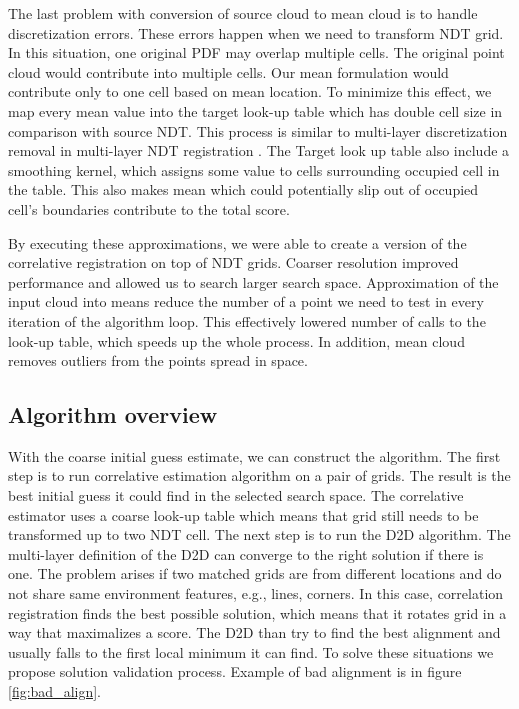 The last problem with conversion of source cloud to mean cloud is to handle discretization errors. These errors happen when we need to transform \gls{NDT} grid. In this situation, one original \gls{PDF} may overlap multiple cells. The original point cloud would contribute into multiple cells. Our mean formulation would contribute only to one cell based on mean location. To minimize this effect, we map every mean value into the target look-up table which has double cell size in comparison with source \gls{NDT}. This process is similar to multi-layer discretization removal in multi-layer \gls{NDT} registration \cite{ulas20113d}. The Target look up table also include a smoothing kernel, which assigns some value to cells surrounding occupied cell in the table. This also makes mean which could potentially slip out of occupied cell's boundaries contribute to the total score.

By executing these approximations, we were able to create a version of the correlative registration on top of \gls{NDT} grids. Coarser resolution improved performance and allowed us to search larger search space. Approximation of the input cloud into means reduce the number of a point we need to test in every iteration of the algorithm loop. This effectively lowered number of calls to the look-up table, which speeds up the whole process. In addition, mean cloud removes outliers from the points spread in space.


\subsection{Algorithm overview}
With the coarse initial guess estimate, we can construct the algorithm. The first step is to run correlative estimation algorithm on a pair of grids. The result is the best initial guess it could find in the selected search space. The correlative estimator uses a coarse look-up table which means that grid still needs to be transformed up to two \gls{NDT} cell. The next step is to run the \gls{D2D} algorithm. The multi-layer definition of the \gls{D2D} can converge to the right solution if there is one. The problem arises if two matched grids are from different locations and do not share same environment features, e.g., lines, corners. In this case, correlation registration finds the best possible solution, which means that it rotates grid in a way that maximalizes a score. The \gls{D2D} than try to find the best alignment and usually falls to the first local minimum it can find. To solve these situations we propose solution validation process. Example of bad alignment is in figure \ref{fig:bad_align}. 




